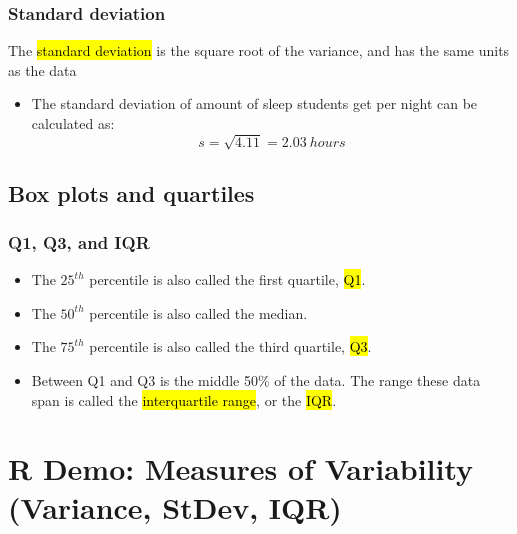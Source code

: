 \documentclass[slidestop,compress,mathserif]{beamer}
\makeatletter
\def\chpii@path{../../Chp 2}
\makeatother
\begin{document}
\begin{frame}
\frametitle{Standard deviation}

The \hl{standard deviation} is the square root of the variance, and has the same units as the data

\formula{
\[ s = \sqrt{s^2} \]
}

\pause

{
\begin{itemize}

\item The standard deviation of amount of sleep students get per night can be calculated as:
\[ s = \sqrt{4.11} = 2.03~hours\]

\end{itemize}
}
{
}

\end{frame}


\subsection{Box plots and quartiles}


\begin{frame}[fragile]
\frametitle{Q1, Q3, and IQR}

\begin{itemize}

\item The $25^{th}$ percentile is also called the first quartile, \hl{Q1}.

\item The $50^{th}$ percentile is also called the median.

\item The $75^{th}$ percentile is also called the third quartile, \hl{Q3}.

\item Between Q1 and Q3 is the middle 50\% of the data. The range these data span is called the \hl{interquartile range}, or the \hl{IQR}.
\formula{\[ IQR = Q3 - Q1 \]}
\end{itemize}

\end{frame}

\section{R Demo: Measures of Variability (Variance, StDev, IQR)}



\end{document}
